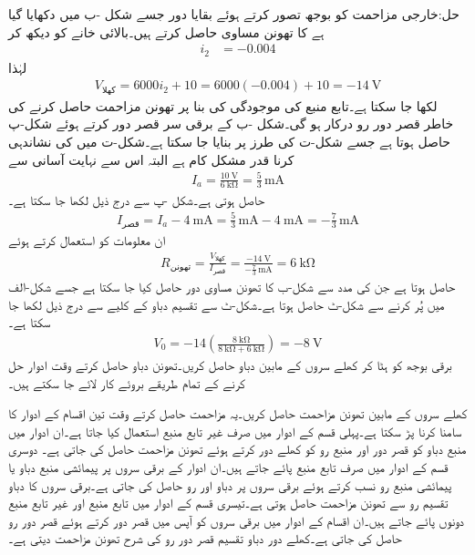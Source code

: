 حل:خارجی  مزاحمت کو بوجھ تصور کرتے ہوئے بقایا دور جسے شکل -ب میں دکھایا گیا ہے کا تھونن مساوی حاصل کرتے ہیں۔بالائی خانے کو دیکھ کر
\begin{align*}
i_2&=-0.004
\end{align*}
لہٰذا
\begin{align*}
V_{\text{کھلا}}=6000 i_2+10= 6000(-0.004)+10=\SI{-14}{\volt}
\end{align*}
لکھا جا سکتا ہے۔تابع منبع کی موجودگی کی بنا پر تھونن مزاحمت حاصل کرنے کی خاطر قصر دور رو درکار ہو گی۔شکل -ب کے برقی سر قصر دور کرتے ہوئے  شکل-پ حاصل ہوتا ہے جسے شکل-ت کی طرز پر بنایا جا سکتا ہے۔شکل-ت میں  کی نشاندہی کرنا قدر مشکل کام ہے البتہ اس سے  نہایت آسانی سے
\begin{align*}
I_a=\frac{\SI{10}{\volt}}{\SI{6}{\kilo\ohm}}=\frac{5}{3}\, \si{\milli\ampere}
\end{align*}
 حاصل ہوتی ہے۔شکل -پ سے درج ذیل لکھا جا سکتا ہے۔
\begin{align*}
I_{\text{قصر}}=I_a-\SI{4}{\milli\ampere}=\frac{5}{3}\, \si{\milli\ampere}-\SI{4}{\milli\ampere}=-\frac{7}{3}\, \si{\milli\ampere}
\end{align*}
ان معلومات کو استعمال کرتے ہوئے
\begin{align*}
R_{\text{تھونن}}=\frac{V_{\text{کھلا}}}{I_{\text{قصر}}}=\frac{\SI{-14}{\volt}}{-\frac{7}{3}\,\si{\milli\ampere}}=\SI{6}{\kilo\ohm}
\end{align*}
حاصل ہوتا ہے جن کی مدد سے شکل-ب کا تھونن مساوی دور حاصل کیا جا سکتا ہے جسے شکل-الف میں پُر کرنے سے شکل-ٹ حاصل ہوتا ہے۔شکل-ٹ سے تقسیم دباو کے کلیے سے درج ذیل لکھا جا سکتا ہے۔
\begin{align*}
V_0=-14 \left(\frac{\SI{8}{\kilo\ohm}}{\SI{8}{\kilo\ohm}+\SI{6}{\kilo\ohm}}\right)=\SI{-8}{\volt}
\end{align*}
برقی بوجھ کو ہٹا کر کھلے سروں کے مابین  دباو  حاصل کریں۔تھونن دباو حاصل کرتے وقت ادوار حل کرنے کے تمام طریقے بروئے کار لائے جا سکتے ہیں۔

کھلے سروں کے مابین تھونن مزاحمت حاصل کریں۔یہ مزاحمت حاصل کرتے وقت تین اقسام کے ادوار کا سامنا کرنا پڑ سکتا ہے۔پہلی قسم  کے ادوار میں صرف غیر تابع منبع استعمال کیا جاتا ہے۔ان ادوار میں منبع دباو کو قصر دور اور منبع رو کو کھلے دور کرتے ہوئے  تھونن مزاحمت حاصل کی جاتی ہے۔ دوسری قسم کے ادوار میں صرف تابع منبع پائے جاتے ہیں۔ان ادوار کے برقی سروں پر پیمائشی منبع دباو یا پیمائشی منبع رو نسب کرتے ہوئے برقی سروں پر دباو اور رو حاصل کی جاتی ہے۔برقی سروں کا دباو تقسیم رو سے تھونن مزاحمت حاصل ہوتی ہے۔تیسری قسم کے ادوار میں تابع منبع اور غیر تابع منبع دونوں پائے جاتے ہیں۔ان اقسام کے ادوار میں برقی سروں کو آپس میں قصر دور کرتے ہوئے قصر دور رو حاصل کی جاتی ہے۔کھلے دور دباو تقسیم قصر دور رو کی شرح تھونن مزاحمت دیتی ہے۔

